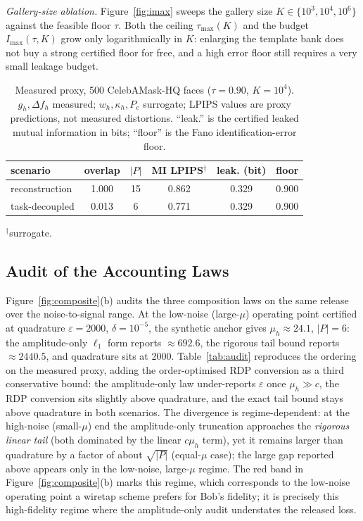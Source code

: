 \documentclass[10pt,twocolumn,letterpaper]{article}
\theoremstyle{plain}
\theoremstyle{definition}
\begin{document}
\emph{Gallery-size ablation.} Figure~\ref{fig:imax} sweeps the gallery size
$K\in\{10^{3},10^{4},10^{6}\}$ against the feasible floor $\tau$. Both the
ceiling $\tau_{\max}(K)$ and the budget $I_{\max}(\tau,K)$ grow only
logarithmically in $K$: enlarging the template bank does not buy a strong
certified floor for free, and a high error floor still requires a very small
leakage budget.

\begin{table}[t]
\centering\footnotesize
\setlength{\tabcolsep}{3.5pt}
\caption{Measured proxy, 500 CelebAMask-HQ faces ($\tau{=}0.90$, $K{=}10^{4}$).
$g_h,\Delta f_h$ measured; $w_h,\kappa_h,P_e$ surrogate; LPIPS values are
proxy predictions, not measured distortions. ``leak.'' is the certified leaked
mutual information in bits; ``floor'' is the Fano identification-error floor.}
\label{tab:measured}
\begin{tabular}{lccccc}
\toprule
scenario & overlap & $|P|$ & MI LPIPS$^\dagger$ & leak. (bit) & floor \\
\midrule
reconstruction & 1.000 & 15 & 0.862 & 0.329 & 0.900 \\
task-decoupled & 0.013 & 6 & 0.771 & 0.329 & 0.900 \\
\bottomrule
\end{tabular}
$^\dagger$surrogate.
\end{table}

\subsection{Audit of the Accounting Laws}

Figure~\ref{fig:composite}(b) audits the three composition laws on the same
release over the noise-to-signal range. At the low-noise (large-$\mu$)
operating point certified at quadrature $\varepsilon=2000$, $\delta=10^{-5}$,
the synthetic anchor gives $\mu_h\approx24.1$, $|P|=6$: the amplitude-only
$\ell_1$ form reports $\approx692.6$, the rigorous tail bound reports
$\approx2440.5$, and quadrature sits at 2000. Table~\ref{tab:audit} reproduces
the ordering on the measured proxy, adding the order-optimised RDP conversion
as a third conservative bound: the amplitude-only law under-reports
$\varepsilon$ once $\mu_h\gg c$, the RDP conversion sits slightly above
quadrature, and the exact tail bound stays above quadrature in both scenarios.
The divergence is regime-dependent: at the high-noise (small-$\mu$) end the
amplitude-only truncation approaches the \emph{rigorous linear tail}
(both dominated by the linear $c\mu_h$ term), yet it remains larger than
quadrature by a factor of about $\sqrt{|P|}$ (equal-$\mu$ case); the large gap
reported above appears only in the low-noise, large-$\mu$ regime. The red band in
Figure~\ref{fig:composite}(b) marks this regime, which corresponds to the
low-noise operating point a wiretap scheme prefers for Bob's fidelity; it is
precisely this high-fidelity regime where the amplitude-only audit understates
the released loss.
\end{document}
